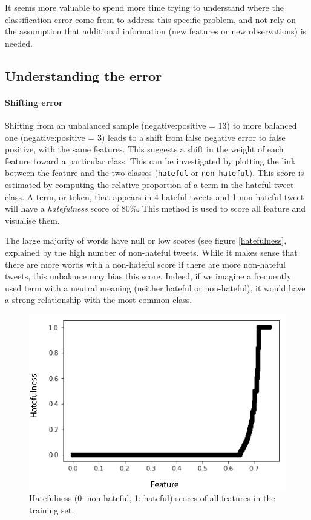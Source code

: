 \documentclass[a4paper, justified]{tufte-handout}
\begin{document}
\begin{fullwidth}
It seems more valuable to spend more time trying to understand where the classification error come from to address this specific problem, and not rely on the assumption that additional information (new features or new observations) is needed.


\subsection{Understanding the error}

\paragraph{Shifting error}

Shifting from an unbalanced sample (negative:positive = 13) to more balanced one (negative:positive = 3) leads to a shift from false negative error to false positive, with the same features. This suggests a shift in the weight of each feature toward a particular class. This can be investigated by plotting the link between the feature and the two classes (\texttt{hateful} or \texttt{non-hateful}). This score is estimated by computing the relative proportion of a term in the hateful tweet class. A term, or token, that appears in 4 hateful tweets and 1 non-hateful tweet will have a \textit{hatefulness} score of 80\%. This method is used to score all feature and visualise them.


The large majority of words have null or low scores (see figure \ref{hatefulness}, explained by the high number of non-hateful tweets. While it makes sense that there are more words with a non-hateful score if there are more non-hateful tweets, this unbalance may bias this score. Indeed, if we imagine a frequently used term with a neutral meaning (neither hateful or non-hateful), it would have a strong relationship with the most common class. 

\begin{figure}\label{hatefulness}
  \includegraphics[]{images/hatefulness.pdf}
  \caption{Hatefulness (0: non-hateful, 1: hateful) scores of all features in the training set.}
  \label{fig:marginfig}
\end{figure}


\end{fullwidth}
\end{document}
